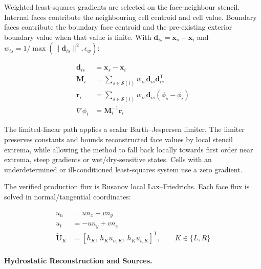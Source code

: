 Weighted least-squares gradients are selected on the face-neighbour
stencil. Internal faces contribute the neighbouring cell centroid and
cell value. Boundary faces contribute the boundary face centroid and the
pre-existing exterior boundary value when that value is finite. With
$\mathbf{d}_{is}=\mathbf{x}_s-\mathbf{x}_i$ and
$w_{is}=1/\max(\|\mathbf{d}_{is}\|^2,\epsilon_w)$:

\begin{align}
  \mathbf{d}_{is}
  &=
  \mathbf{x}_s
  -
  \mathbf{x}_i
  \label{eq:res-num-spec-regional-neighbour-displacement}
  \\
  \mathbf{M}_i
  &=
  \sum_{s\in\mathcal{S}(i)}
  w_{is}
  \mathbf{d}_{is}
  \mathbf{d}_{is}^{\mathsf{T}}
  \label{eq:res-num-spec-regional-ls-matrix}
  \\
  \mathbf{r}_i
  &=
  \sum_{s\in\mathcal{S}(i)}
  w_{is}
  \mathbf{d}_{is}
  \left(
    \phi_s-\phi_i
  \right)
  \label{eq:res-num-spec-regional-ls-rhs}
  \\
  \nabla\phi_i
  &=
  \mathbf{M}_i^{-1}
  \mathbf{r}_i
  \label{eq:res-num-spec-regional-ls-gradient}
\end{align}

The limited-linear path applies a scalar Barth--Jespersen limiter. The
limiter preserves constants and bounds reconstructed face values by
local stencil extrema, while allowing the method to fall back locally
towards first order near extrema, steep gradients or wet/dry-sensitive
states. Cells with an underdetermined or ill-conditioned least-squares
system use a zero gradient.

The verified production flux is Rusanov local Lax--Friedrichs. Each
face flux is solved in normal/tangential coordinates:

\begin{align}
  u_n
  &=
  u n_x
  +
  v n_y
  \label{eq:res-num-spec-regional-normal-velocity}
  \\
  u_t
  &=
  -u n_y
  +
  v n_x
  \label{eq:res-num-spec-regional-tangential-velocity}
  \\
  \widetilde{\mathbf{U}}_K
  &=
  \left[
    h_K,\,
    h_K u_{n,K},\,
    h_K u_{t,K}
  \right]^{\mathsf{T}},
  \qquad
  K\in\{L,R\}
  \label{eq:res-num-spec-regional-rotated-state}
\end{align}

\paragraph{Hydrostatic Reconstruction and Sources.}
\label{sec:res-num-spec-regional-hydrostatic-source}

